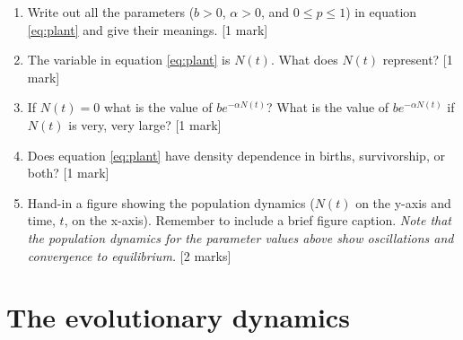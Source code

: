 \documentclass[]{book}
\begin{document}
\begin{enumerate}
\def\labelenumi{\arabic{enumi}.}
\item
  Write out all the parameters (\(b>0\), \(\alpha>0\), and
  \(0 \leq p \leq 1\)) in equation \eqref{eq:plant} and give their
  meanings. {[}1 mark{]}
\item
  The variable in equation \eqref{eq:plant} is \(N(t)\). What does
  \(N(t)\) represent? {[}1 mark{]}
\item
  If \(N(t) = 0\) what is the value of \(be^{-\alpha N(t)}\)? What is
  the value of \(be^{-\alpha N(t)}\) if \(N(t)\) is very, very large?
  {[}1 mark{]}
\item
  Does equation \eqref{eq:plant} have density dependence in births,
  survivorship, or both? {[}1 mark{]}
\item
  Hand-in a figure showing the population dynamics (\(N(t)\) on the
  y-axis and time, \(t\), on the x-axis). Remember to include a brief
  figure caption. \emph{Note that the population dynamics for the
  parameter values above show oscillations and convergence to
  equilibrium.} {[}2 marks{]}
\end{enumerate}

\section{The evolutionary dynamics}\label{the-evolutionary-dynamics}
\end{document}

